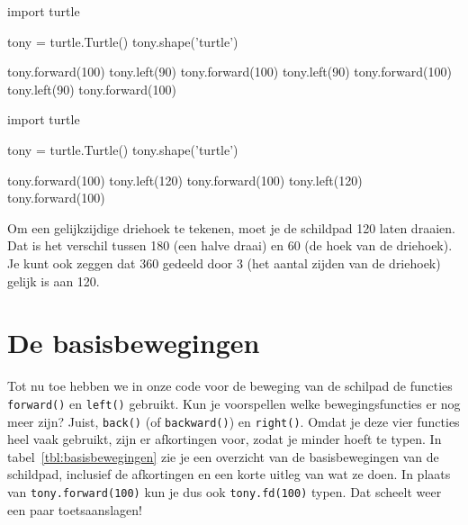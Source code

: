 \documentclass[../main]{subfiles}
\begin{document}
\begin{antwoord}
\begin{qlist}
\item
\begin{python-breakable}[style=mu-noframe]
import turtle

tony = turtle.Turtle()
tony.shape('turtle')

tony.forward(100)
tony.left(90)
tony.forward(100)
tony.left(90)
tony.forward(100)
tony.left(90)
tony.forward(100)
\end{python-breakable}
\item
\begin{python-breakable}[style=mu-noframe]
import turtle

tony = turtle.Turtle()
tony.shape('turtle')

tony.forward(100)
tony.left(120)
tony.forward(100)
tony.left(120)
tony.forward(100)
\end{python-breakable}
\item Om een gelijkzijdige driehoek te tekenen, moet je de schildpad 120\textdegree{} laten draaien. Dat is het verschil tussen 180\textdegree{} (een halve draai) en 60\textdegree{} (de hoek van de driehoek). Je kunt ook zeggen dat 360\textdegree{} gedeeld door 3 (het aantal zijden van de driehoek) gelijk is aan 120\textdegree{}.

\begin{center}
\end{center}
\end{qlist}
\end{antwoord}
\section{De basisbewegingen}%
\label{sec:basisbewegingen}

Tot nu toe hebben we in onze code voor de beweging van de schilpad de functies \texttt{forward()} en \texttt{left()} gebruikt. Kun je voorspellen welke bewegingsfuncties er nog meer zijn? Juist, \texttt{back()} (of \texttt{backward()}) en \texttt{right()}. Omdat je deze vier functies heel vaak gebruikt, zijn er afkortingen voor, zodat je minder hoeft te typen. In tabel~\ref{tbl:basisbewegingen} zie je een overzicht van de basisbewegingen van de schildpad, inclusief de afkortingen en een korte uitleg van wat ze doen. In plaats van \texttt{tony.forward(100)} kun je dus ook \texttt{tony.fd(100)} typen. Dat scheelt weer een paar toetsaanslagen!
\end{document}
